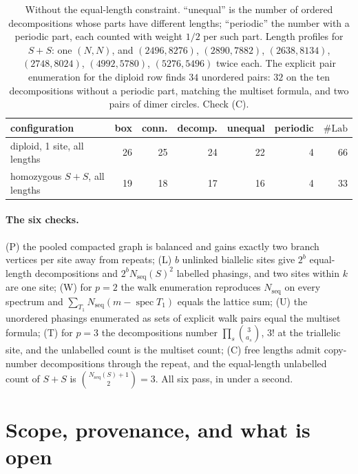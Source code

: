 \documentclass[11pt]{article}
\theoremstyle{plain}
\theoremstyle{definition}
\theoremstyle{remark}
\newcommand{\spec}{\operatorname{spec}}
\newcommand{\Nseq}{N_{\mathrm{seq}}}
\newcommand{\Lab}{\#\mathrm{Lab}}
\begin{document}
\begin{table}[t]
\centering
\small
\begin{tabular}{lrrrrrr}
\toprule
configuration & box & conn. & decomp. & unequal & periodic & $\Lab$\\
\midrule
diploid, 1 site, all lengths & 26 & 25 & 24 & 22 & 4 & 66\\
homozygous $S+S$, all lengths & 19 & 18 & 17 & 16 & 4 & 33\\
\bottomrule
\end{tabular}
\caption{Without the equal-length constraint. ``unequal'' is the number of ordered
decompositions whose parts have different lengths; ``periodic'' the number with a periodic
part, each counted with weight $1/2$ per such part. Length profiles for $S+S$: one $(N,N)$,
and $(2496,8276)$, $(2890,7882)$, $(2638,8134)$, $(2748,8024)$, $(4992,5780)$, $(5276,5496)$
twice each. The explicit pair enumeration for the diploid row finds $34$ unordered pairs: $32$
on the ten decompositions without a periodic part, matching the multiset formula, and two
pairs of dimer circles. Check (C).}
\label{tab:cnv}
\end{table}

\paragraph{The six checks.} (P) the pooled compacted graph is balanced and gains exactly two
branch vertices per site away from repeats; (L) $b$ unlinked biallelic sites give $2^b$
equal-length decompositions and $2^b\Nseq(S)^2$ labelled phasings, and two sites within $k$
are one site; (W) for $p=2$ the walk enumeration reproduces $\Nseq$ on every spectrum and
$\sum_{T_1}\Nseq(m-\spec T_1)$ equals the lattice sum; (U) the unordered phasings enumerated
as sets of explicit walk pairs equal the multiset formula; (T) for $p=3$ the decompositions
number $\prod_s\binom{3}{a_s}$, $3!$ at the triallelic site, and the unlabelled count is the
multiset count; (C) free lengths admit copy-number decompositions through the repeat, and the
equal-length unlabelled count of $S+S$ is $\binom{\Nseq(S)+1}{2}=3$. All six pass, in under a
second.

\section{Scope, provenance, and what is open}
\end{document}
